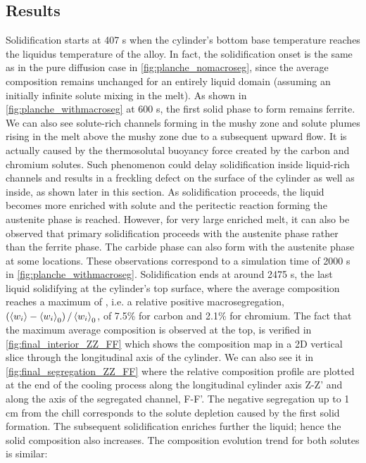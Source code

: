 \subsection{Results}
Solidification starts at 407 s when the cylinder’s bottom base temperature 
reaches the liquidus temperature of the alloy. 
In fact, the solidification onset is the same as in the pure diffusion case in \cref{fig:planche_nomacroseg}, 
since the average composition remains unchanged for an entirely liquid domain (assuming an initially infinite 
solute mixing in the melt). As shown in \cref{fig:planche_withmacroseg} at 600 s, the first solid phase to form 
remains ferrite. We can also see solute-rich channels forming in the mushy zone and solute 
plumes rising in the melt above the mushy zone due to a subsequent upward flow. It is actually 
caused by the thermosolutal buoyancy force created by the carbon and chromium solutes. Such 
phenomenon could delay solidification inside liquid-rich channels and results in a freckling 
defect \citep{felicelli_simulation_1991} on the surface of the cylinder as well as inside, as shown later in this section. 
As solidification proceeds, the liquid becomes more enriched with solute and the peritectic 
reaction forming the austenite phase is reached. However, for very large enriched melt, it can 
also be observed that primary solidification proceeds with the austenite phase rather than the 
ferrite phase. The carbide phase can also form with the austenite phase at some locations. These 
observations correspond to a simulation time of \num{2000} s in \cref{fig:planche_withmacroseg}. Solidification ends at 
around \num{2475} s, the last liquid solidifying at the cylinder’s top surface, where the average composition 
reaches a maximum of , i.e. a relative positive macrosegregation, 
$\left( \left \langle w_i \right \rangle-\left \langle w_i \right \rangle_0 \right)/\left \langle w_i \right \rangle_0$, of 7.5\% for carbon and 2.1\% for chromium. The fact that the maximum average 
composition is observed at the top, is verified in \cref{fig:final_interior_ZZ_FF} which shows the composition map in a 2D 
vertical slice through the longitudinal axis of the cylinder. We can also see it in \cref{fig:final_segregation_ZZ_FF} where the 
relative composition profile are plotted at the end of the cooling process along the longitudinal cylinder 
axis Z-Z’ and along the axis of the segregated channel, F-F’. The negative segregation up to 1 cm from the chill corresponds 
to the solute depletion caused by the first solid formation. The subsequent solidification enriches further the 
liquid; hence the solid composition also increases. The composition evolution trend for both solutes is similar: 
